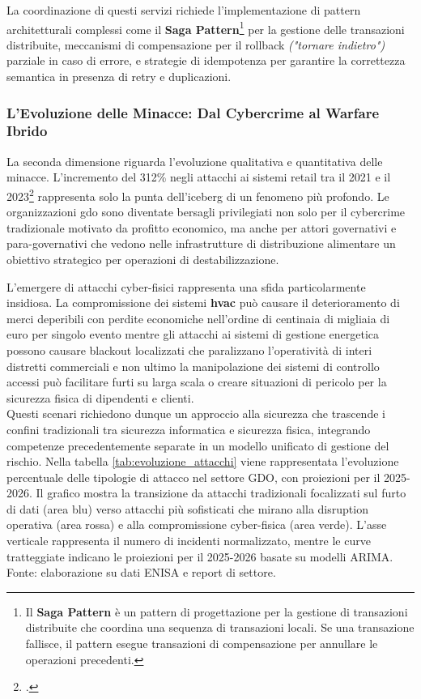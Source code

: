 La coordinazione di questi servizi richiede l'implementazione di pattern architetturali complessi come il \textbf{Saga Pattern}\footnote{Il \textbf{Saga Pattern} è un pattern di progettazione per la gestione di transazioni distribuite che coordina una sequenza di transazioni locali. Se una transazione fallisce, il pattern esegue transazioni di compensazione per annullare le operazioni precedenti.} per la gestione delle transazioni distribuite, meccanismi di compensazione per il rollback \emph{("tornare indietro")} parziale in caso di errore, e strategie di idempotenza per garantire la correttezza semantica in presenza di retry e duplicazioni.

\subsubsection{\texorpdfstring{\textbf{L'Evoluzione delle Minacce: Dal Cybercrime al Warfare Ibrido}}{1.1.2.2 - L'Evoluzione delle Minacce: Dal Cybercrime al Warfare Ibrido}}

La seconda dimensione riguarda l'evoluzione qualitativa e quantitativa delle minacce. L'incremento del 312\% negli attacchi ai sistemi retail tra il 2021 e il 2023\footcite{enisa2024retail} rappresenta solo la punta dell'iceberg di un fenomeno più profondo. Le organizzazioni \gls{gdo} sono diventate bersagli privilegiati non solo per il cybercrime tradizionale motivato da profitto economico, ma anche per attori governativi e para-governativi che vedono nelle infrastrutture di distribuzione alimentare un obiettivo strategico per operazioni di destabilizzazione.

L'emergere di attacchi cyber-fisici rappresenta una sfida particolarmente insidiosa. La compromissione dei sistemi \textbf{\gls{hvac}} può causare il deterioramento di merci deperibili con perdite economiche nell'ordine di centinaia di migliaia di euro per singolo evento mentre gli attacchi ai sistemi di gestione energetica possono causare blackout localizzati che paralizzano l'operatività di interi distretti commerciali e non ultimo la manipolazione dei sistemi di controllo accessi può facilitare furti su larga scala o creare situazioni di pericolo per la sicurezza fisica di dipendenti e clienti.\\ 
Questi scenari richiedono dunque un approccio alla sicurezza che trascende i confini tradizionali tra sicurezza informatica e sicurezza fisica, integrando competenze precedentemente separate in un modello unificato di gestione del rischio.
Nella tabella \ref{tab:evoluzione_attacchi} viene rappresentata l'evoluzione percentuale delle tipologie di attacco nel settore GDO, con proiezioni per il 2025-2026. Il grafico mostra la transizione da attacchi tradizionali focalizzati sul furto di dati (area blu) verso attacchi più sofisticati che mirano alla disruption operativa (area rossa) e alla compromissione cyber-fisica (area verde). L'asse verticale rappresenta il numero di incidenti normalizzato, mentre le curve tratteggiate indicano le proiezioni per il 2025-2026 basate su modelli ARIMA. Fonte: elaborazione su dati ENISA e report di settore.


